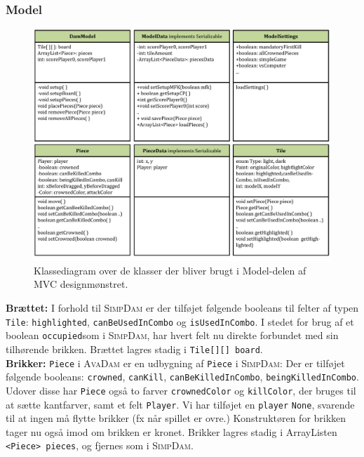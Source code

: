 \subsubsection{Model}
\vspace{-0.5cm}
\begin{figure}[H]
\centering
\includegraphics[width = 1.0  \textwidth]{Figurer/classesModel.pdf}
\caption{Klassediagram over de klasser der bliver brugt i Model-delen af MVC designmønstret.}
\label{fig:classesModel}
\end{figure}

\textbf{Brættet:} I forhold til \textsc{SimpDam} er der tilføjet følgende booleans til felter af typen \texttt{Tile}: \texttt{highlighted}, \texttt{canBeUsedInCombo} og \texttt{isUsedInCombo}. I stedet for brug af et boolean \texttt{occupied}som i \textsc{SimpDam}, har hvert felt nu direkte forbundet med sin tilhørende brikken. Brættet lagres stadig i \texttt{Tile[][] board}. \\

\textbf{Brikker:} \texttt{Piece} i \textsc{AvaDam} er en udbygning af \texttt{Piece} i \textsc{SimpDam}: Der er tilføjet følgende booleans:  \texttt{crowned}, \texttt{canKill}, \texttt{canBeKilledInCombo}, \texttt{beingKilledInCombo}. Udover disse har \texttt{Piece} også to farver \texttt{crownedColor} og \texttt{killColor}, der bruges til at sætte kantfarver, samt et felt \texttt{Player}. Vi har tilføjet en \texttt{player} \texttt{None}, svarende til at ingen må flytte brikker (fx når spillet er ovre.) Konstruktøren for brikken tager nu også imod om brikken er kronet. Brikker lagres stadig i ArrayListen \texttt{<Piece> pieces}, og fjernes som i \textsc{SimpDam}. \\

